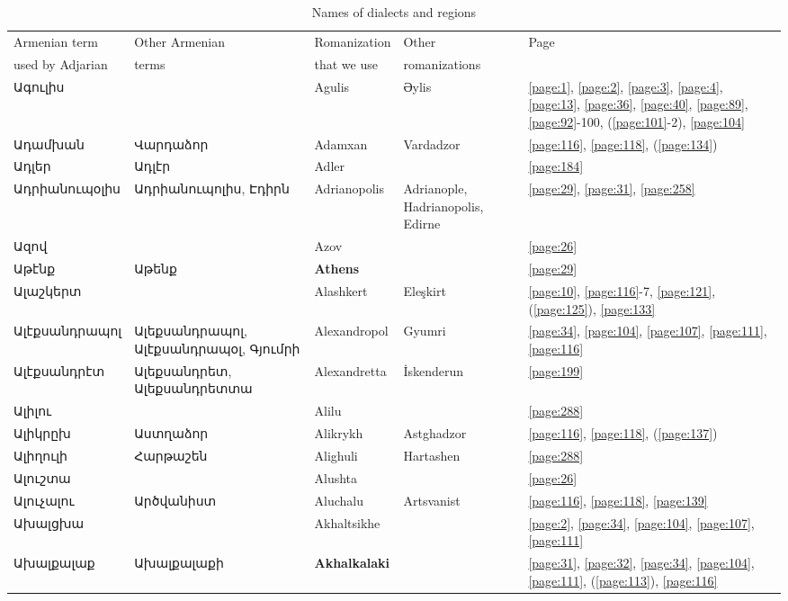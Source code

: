\begin{center}
\begin{longtable}{|p{}|p{3cm}|p{3cm}|p{2cm}|p{3cm}|}
\caption{Names of dialects and regions} \label{tab:long} \\ \hline
\hline Armenian term & Other Armenian  & Romanization   & Other   & Page \\ 
used by Adjarian  & terms&   that we use&romanizations & 
\\ \hline\hline
Ագուլիս & & 
{Agulis}   &Əylis &\ref{page:1}, \ref{page:2}, \ref{page:3}, \ref{page:4}, \ref{page:13}, \ref{page:36}, \ref{page:40}, \ref{page:89}, \ref{page:92}-100, (\ref{page:101}-2), \ref{page:104}\\ \hline
Ադամխան&  Վարդաձոր & 
{Adamxan} & Vardadzor
&\ref{page:116}, \ref{page:118}, (\ref{page:134})\\ \hline
Ադլեր&Ադլէր & 
{Adler}& &\ref{page:184}\\ \hline
Ադրիանուպօլիս&Ադրիանուպոլիս, Էդիրն
& {Adrianopolis}  & Adrianople,  Hadrianopolis, Edirne &\ref{page:29}, \ref{page:31}, \ref{page:258}\\ \hline
Ազով& &
{Azov}& &\ref{page:26}\\ \hline
Աթէնք& Աթենք&
\textbf{Athens}& &\ref{page:29}\\ \hline
Ալաշկերտ& &
{Alashkert}& Eleşkirt&\ref{page:10}, \ref{page:116}-7, \ref{page:121}, (\ref{page:125}), \ref{page:133}\\ \hline
Ալէքսանդրապոլ&Ալեքսանդրապոլ,  Ալէքսանդրապօլ,  Գյումրի
&{Alexandropol} & Gyumri&\ref{page:34}, \ref{page:104}, \ref{page:107}, \ref{page:111}, \ref{page:116}\\ \hline
Ալէքսանդրէտ&Ալեքսանդրետ, Ալեքսանդրետտա &
{Alexandretta}& İskenderun&\ref{page:199}\\ \hline
Ալիլու& 
&{Alilu}& &\ref{page:288}\\ \hline
Ալիկրըխ&Աստղաձոր &
{Alikrykh}&Astghadzor &\ref{page:116}, \ref{page:118}, (\ref{page:137})\\ \hline
Ալիղուլի& Հարթաշեն
& {Alighuli}& Hartashen&\ref{page:288}\\ \hline
Ալուշտա& &
{Alushta}& &\ref{page:26}\\ \hline
Ալուչալու&    Արծվանիստ 
&{Aluchalu} &Artsvanist &\ref{page:116}, \ref{page:118}, \ref{page:139}\\ \hline
Ախալցխա& 
&{Akhaltsikhe} & &\ref{page:2}, \ref{page:34}, \ref{page:104}, \ref{page:107}, \ref{page:111}\\ \hline
Ախալքալաք&Ախալքալաքի & 
\textbf{Akhalkalaki}& &\ref{page:31}, \ref{page:32}, \ref{page:34}, \ref{page:104}, \ref{page:111}, (\ref{page:113}), \ref{page:116}\\ \hline

\end{longtable}
\end{center}
